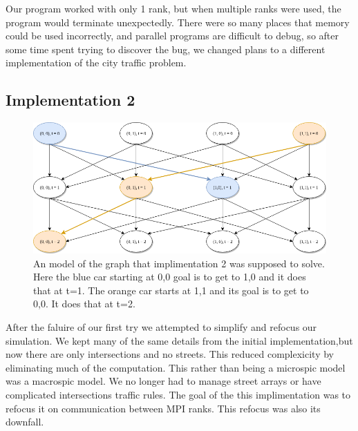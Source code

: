 \documentclass[10pt,a4paper]{article}
\begin{document}
    Our program worked with only 1 rank, but when multiple ranks were used, the program would terminate unexpectedly. There were so many places that memory could be used incorrectly, and parallel programs are difficult to debug, so after some time spent trying to discover the bug, we changed plans to a different implementation of the city traffic problem.
    
    \subsection{Implementation 2}
    
    \begin{figure}
        \centering
        \includegraphics[scale=0.5]{imp2_diag.png}
        \caption{An model of the graph that implimentation 2 was supposed to solve. Here the blue car starting at 0,0 goal is to get to 1,0 and it does that at t=1. The orange car starts at 1,1 and its goal is to get to 0,0. It does that at t=2.}
        \label{fig:my_label}
    \end{figure}
    
    
    After the faluire of our first try we attempted to simplify and refocus our simulation. We kept many of the same details from the initial implementation,but now there are only intersections and no streets. This reduced complexicity by eliminating much of the computation. This rather than being a microspic model was a macrospic model. We no longer had to manage street arrays or have complicated intersections traffic rules. The goal of the this implimentation was to refocus it on communication between MPI ranks. This refocus was also its downfall. 
    
\end{document}
